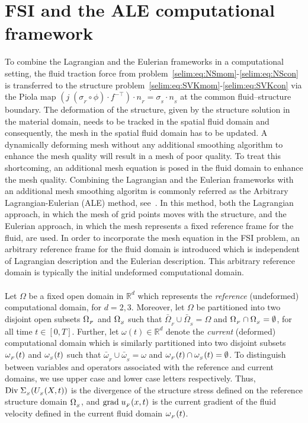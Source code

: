 \section{FSI and the ALE computational framework}
\label{selim:sec:ale}
To combine the Lagrangian and the Eulerian frameworks in a
computational setting, the fluid traction force from
problem~\eqref{selim:eq:NSmom}-\eqref{selim:eq:NScon} is transferred
to the structure
problem~\eqref{selim:eq:SVKmom}-\eqref{selim:eq:SVKcon} via the Piola
map $(j\; (\sigma_{_{F}}\circ \phi)\cdot f^{-\top})\cdot n_{_{F}}
= \sigma_{_{S}}\cdot n_{_{S}}$ at the common fluid--structure
boundary.  The deformation of the structure, given by the structure
solution in the material domain, needs to be tracked in the spatial
fluid domain and consequently, the mesh in the spatial fluid domain
has to be updated. A dynamically deforming mesh without any additional
smoothing algorithm to enhance the mesh quality will result in a mesh
of poor quality. To treat this shortcoming, an additional mesh
equation is posed in the fluid domain to enhance the mesh
quality. Combining the Lagrangian and the Eulerian frameworks with an
additional mesh smoothing algoritm is commonly referred as the
Arbitrary Lagrangian-Eulerian (ALE) method,
see~\cite{DoneaGiulianiHalleux1982, DoneaHuertaPonthotEtAl2004}.  In this
method, both the Lagrangian approach, in which the mesh of grid points
moves with the structure, and the Eulerian approach, in which the mesh
represents a fixed reference frame for the fluid, are used. In order
to incorporate the mesh equation in the FSI problem, an arbitrary
reference frame for the fluid domain is introduced which is
independent of Lagrangian description and the Eulerian
description. This arbitrary reference domain is typically the initial
undeformed computational domain.
\\\\
Let $\Omega$ be a fixed open domain in $\mathbb{R}^d$ which represents
the \emph{reference} (undeformed) computational domain, for
$d=2,3$. Moreover, let $\Omega$ be partitioned into two disjoint open
subsets $\Omega_{_{F}}$ and $\Omega_{_{S}}$ such that
$\bar{\Omega}_{_{F}}\cup\bar{\Omega}_{_{S}} = \Omega$ and
$\Omega_{_{F}}\cap\Omega_{_{S}}=\emptyset$, for all time $t\in[0,T]$. Further, let
$\omega(t)\in\mathbb{R}^d$ denote the \emph{current} (deformed)
computational domain which is similarly partitioned into two disjoint
subsets $\omega_{_{F}}(t)$ and $\omega_{_{S}}(t)$ such that
$\bar{\omega}_{_{F}}\cup\bar{\omega}_{_{S}} = \omega$ and
$\omega_{_{F}}(t)\cap\omega_{_{S}}(t)=\emptyset$. To distinguish between variables and
operators associated with the reference and current domains, we use
upper case and lower case letters respectively. Thus,
$\textrm{Div}\;\Sigma_{_{S}}(U_{_{S}}(X,t))$ is the divergence of the structure stress
defined on the reference structure domain $\Omega_{_{S}}$, and $\textrm{grad}\;u_{_{F}}(x,t)$ is
the current gradient of the fluid velocity defined in the current
fluid domain $\omega_{_{F}}(t)$.

